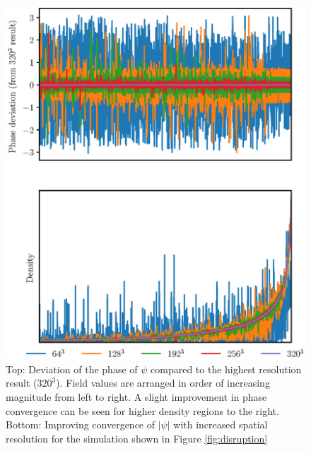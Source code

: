 \documentclass[a4paper,11pt]{article}
\begin{document}
\begin{figure}
  \includegraphics[width=1.\textwidth,trim=0 1cm 0 2cm,clip]{combined2}
  \caption{Top: Deviation of the phase of $\psi$ compared to the highest resolution result ($320^3$). Field values are arranged in order of increasing magnitude from left to right. A slight improvement in phase convergence can be seen for higher density regions to the right. Bottom: Improving convergence of $\vert\psi\vert$ with increased spatial resolution for the simulation shown in Figure \ref{fig:disruption}}
  \label{fig:spatial}
\end{figure}
\clearpage
\end{document}
